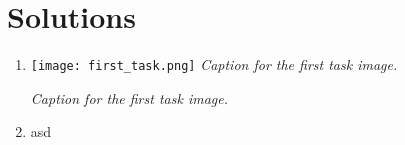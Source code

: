 \documentclass{article}
\begin{document}

\section*{Solutions}
\begin{enumerate}
    \item 
        \begin{center}
        \texttt{[image: first\_task.png]} %
        \textit{Caption for the first task image.} %

    \end{center}
    \textit{Caption for the first task image.} %

        \item asd
\end{enumerate}
\end{document}
